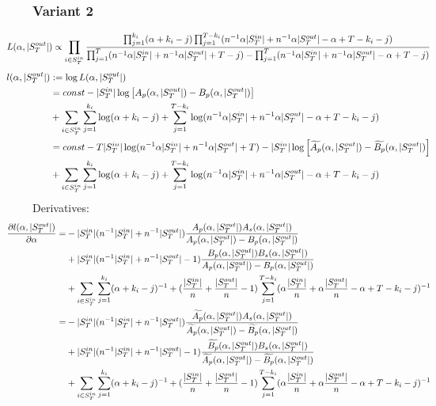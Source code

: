 \documentclass[a4paper, 12pt]{article}
\newcommand{\sout}{|S^{out}_T|}
\newcommand{\sint}{|S^{in}_T|}
\begin{document}
\subsubsection{Variant 2}
\begin{align*}
    \hspace*{-1cm}
    L(\alpha, \sout) &\propto \prod_{i \in S_T^{in}} \frac{\prod_{j=1}^{k_i} (\alpha + k_i - j)\prod_{j=1}^{T - k_i} (n^{-1} \alpha \sint + n^{-1} \alpha \sout -\alpha + T - k_i - j)}{\prod_{j=1}^T(n^{-1}\alpha \sint + n^{-1} \alpha \sout + T - j) - \prod_{j=1}^T (n^{-1} \alpha \sint + n^{-1} \alpha \sout - \alpha + T - j)} \\
\end{align*}
\begin{align} \label{eq:7}
    \hspace*{-1cm}
    l(\alpha, \sout) &:= \log L(\alpha, \sout) \nonumber \\
    &= const - \sint \log \left[A_p(\alpha, \sout) - B_p(\alpha, \sout) \right] \nonumber \\
    &+ \sum_{i \in S_T^{in}} \sum_{j = 1}^{k_i} \log(\alpha + k_i - j) + \sum_{j = 1}^{T - k_i} \log(n^{-1} \alpha \sint + n^{-1} \alpha \sout - \alpha + T - k_i - j) \nonumber \\
    &= const - T\sint \log(n^{-1}\alpha\sint + n^{-1}\alpha\sout + T) - \sint \log \left[\widetilde{A_p}(\alpha, \sout) - \widetilde{B_p}(\alpha, \sout) \right] \nonumber \\
    &+ \sum_{i \in S_T^{in}} \sum_{j = 1}^{k_i} \log(\alpha + k_i - j) + \sum_{j = 1}^{T - k_i} \log(n^{-1} \alpha \sint + n^{-1} \alpha \sout - \alpha + T - k_i - j) \nonumber \\
\end{align}
Derivatives:
\begin{align} \label{eq:8}
    \hspace{-1cm}
    \frac{\partial l(\alpha, \sout)}{\partial \alpha} =& -\sint(n^{-1}\sint + n^{-1}\sout) \frac{ A_p(\alpha, \sout) A_s(\alpha, \sout)}{A_p(\alpha, \sout) - B_p(\alpha, \sout)}\nonumber \\
    &+ \sint (n^{-1}\sint + n^{-1}\sout - 1) \frac{B_p(\alpha, \sout) B_s(\alpha, \sout)}{A_p(\alpha, \sout) - B_p(\alpha, \sout)}\nonumber \\
    &+ \sum_{i \in S_T^{in}} \sum_{j = 1}^{k_i} (\alpha + k_i - j)^{-1} + (\frac{\sint}{n} + \frac{\sout}{n} - 1) \sum_{j = 1}^{T - k_i} (\alpha \frac{\sint}{n} + \alpha \frac{\sout}{n} - \alpha + T - k_i - j)^{-1} \nonumber \\
    =& -\sint(n^{-1}\sint + n^{-1}\sout) \frac{ \widetilde{A_p}(\alpha, \sout) A_s(\alpha, \sout)}{\widetilde{A_p}(\alpha, \sout) - \widetilde{B_p}(\alpha, \sout)}\nonumber \\
    &+ \sint(n^{-1}\sint + n^{-1}\sout - 1) \frac{ \widetilde{B_p}(\alpha, \sout) B_s(\alpha, \sout)}{\widetilde{A_p}(\alpha, \sout) - \widetilde{B_p}(\alpha, \sout)}\nonumber \\
    &+ \sum_{i \in S_T^{in}} \sum_{j = 1}^{k_i} (\alpha + k_i - j)^{-1} + (\frac{\sint}{n} + \frac{\sout}{n} - 1) \sum_{j = 1}^{T - k_i} (\alpha \frac{\sint}{n} + \alpha \frac{\sout}{n} - \alpha + T - k_i - j)^{-1} \nonumber \\
\end{align}
\end{document}

